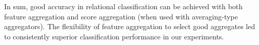 \documentclass[conference]{IEEEtran}
\begin{document}
In sum, good accuracy in relational classification can be achieved with both feature aggregation and score aggregation (when used with averaging-type aggregators). The flexibility of feature aggregation to select good aggregates led to consistently superior classification performance in our experiments.













%
%
%






\end{document}

